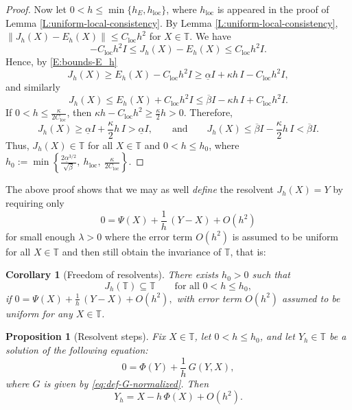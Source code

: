 \documentclass[12pt,reqno]{amsart}
\newtheorem{corollary}[theorem]{Corollary}
\newtheorem{proposition}[theorem]{Proposition}
\begin{document}
\begin{proof}
Now let \( 0 < h \le \min\{h_E, h_{\mathrm{loc}}\} \), where $h_{\mathrm{loc}}$ is appeared in the proof of Lemma \ref{L:uniform-local-consistency}.
By Lemma \ref{L:uniform-local-consistency},
$\| J_h(X) - E_h(X) \| \le C_{\mathrm{loc}} h^2$ for $X \in \mathbb{T}$.
We have
\[
-C_{\mathrm{loc}} h^2 I \le J_h(X)-E_h(X) \le C_{\mathrm{loc}} h^2 I.
\]
Hence, by \eqref{E:bounds-E_h}
\[
J_h(X) \ge E_h(X) - C_{\mathrm{loc}} h^2 I \ge
\underline{\alpha} I + \kappa h \, I - C_{\mathrm{loc}} h^2 I,
\]
and similarly
\[
J_h(X) \le E_h(X) + C_{\mathrm{loc}} h^2 I \le
\overline{\beta} I - \kappa h \, I + C_{\mathrm{loc}} h^2 I.
\]
If
$0 < h \le \frac{\kappa}{2C_{\mathrm{loc}}}$,
then
$\kappa h - C_{\mathrm{loc}} h^2 \ge \frac{\kappa}{2} h > 0$.
Therefore,
\[
J_h(X) \ge \underline{\alpha} I + \frac{\kappa}{2} h \, I > \underline{\alpha}I,
\qquad \textrm{and} \qquad
J_h(X) \le \overline{\beta} I - \frac{\kappa}{2} h \, I < \overline{\beta}I.
\]
Thus, $J_h(X) \in \mathbb{T}$
for all $X \in \mathbb{T}$ and $0 < h \le h_0$,
where
$h_0 := \min \left\{
\frac{2\underline{\alpha}^{3/2}}{\sqrt{\beta}},
\ h_{\mathrm{loc}},
\ \frac{\kappa}{2C_{\mathrm{loc}}}
\right\}$.
\end{proof}

The above proof shows that we may as well \emph{define} the resolvent $J_h(X)=Y$ by requiring only
\begin{equation*}
0 = \Psi(X) + \frac1h \, (Y-X) + O(h^2)
\end{equation*}
for small enough $\lambda>0$ where the error term $O(h^2)$ is assumed to be uniform for all $X\in\mathbb{T}$ and then still obtain the invariance of $\mathbb{T}$, that is:
\begin{corollary}[Freedom of resolvents]
There exists \( h_0 > 0 \) such that
\[
J_h(\mathbb{T}) \subseteq \mathbb{T}
\qquad\text{for all } 0 < h \le h_0,
\]
if $0 = \Psi(X) + \frac1h \, (Y-X) + O(h^2),$ with error term $O(h^2)$ assumed to be uniform for any $X\in\mathbb{T}$.
\end{corollary}

\begin{proposition}[Resolvent steps]
\label{P:concrete-resolvent-consistency}
Fix \( X \in \mathbb{T} \), let \(0 < h \leq h_0 \), and let \( Y_h \in \mathbb{T} \) be a
solution of the following equation:
\begin{equation}\label{eq:normalized-BW-resolvent}
0 = \Phi(Y) + \frac{1}{h} \, G(Y,X),
\end{equation}
where \(G\) is given by \eqref{eq:def-G-normalized}. Then
\begin{equation}\label{eq:normalized-BW-expansion}
Y_h = X - h \, \Phi(X) + O(h^2).
\end{equation}
\end{proposition}
\end{document}
